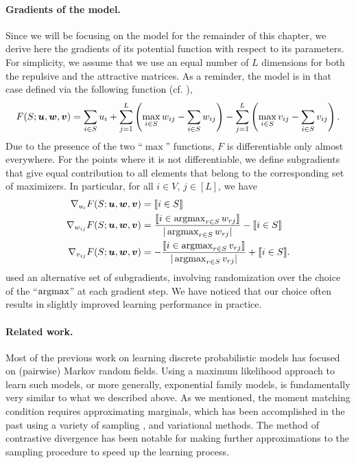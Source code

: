 \paragraph{Gradients of the \fldc{} model.}
Since we will be focusing on the \fldc{} model for the remainder of this chapter, we derive here the gradients of its potential function with respect to its parameters.
For simplicity, we assume that we use an equal number of $L$ dimensions for both the repulsive and the attractive matrices.
As a reminder, the \fldc{} model is in that case defined via the following function (cf. ),
\begin{align*}
F(S; \bm{u}, \bm{w}, \bm{v}) = \sum_{i \in S} u_i + \sum_{j=1}^{L} \left(\max_{i \in S} w_{ij} - \sum_{i \in S} w_{ij}\right) - \sum_{j=1}^{L} \left(\max_{i \in S} v_{ij} - \sum_{i \in S} v_{ij}\right).
\end{align*}
Due to the presence of the two ``$\max$'' functions, $F$ is differentiable only almost everywhere.
For the points where it is not differentiable, we define subgradients that give equal contribution to all elements that belong to the corresponding set of maximizers.
In particular, for all $i \in V$, $j \in [L]$, we have
\begin{align*}
\nabla_{u_i} F(S; \bu, \bw, \bv) &= \llbracket i \in S\rrbracket\\
\nabla_{w_{ij}} F(S; \bu, \bw, \bv) &= \frac{\llbracket i \in \argmax_{r \in S} w_{rj}\rrbracket}{|\argmax_{r \in S} w_{rj}|} - \llbracket i \in S\rrbracket\\
\nabla_{v_{ij}} F(S; \bu, \bw, \bv) &= -\frac{\llbracket i \in \argmax_{r \in S} v_{rj}\rrbracket}{|\argmax_{r \in S} v_{rj}|} + \llbracket i \in S\rrbracket.
\end{align*}
\citet{tschiatschek16} used an alternative set of subgradients, involving randomization over the choice of the ``$\argmax$'' at each gradient step.
We have noticed that our choice often results in slightly improved learning performance in practice.

\paragraph{Related work.}
Most of the previous work on learning discrete probabilistic models has focused on (pairwise) Markov random fields.
Using a maximum likelihood approach to learn such models, or more generally, exponential family models, is fundamentally very similar to what we described above.
As we mentioned, the moment matching condition requires approximating marginals, which has been accomplished in the past using a variety of sampling \citep{geyer91}, and variational \citep{wainwright08} methods.
The method of contrastive divergence \citep{condiv} has been notable for making further approximations to the sampling procedure to speed up the learning process.

